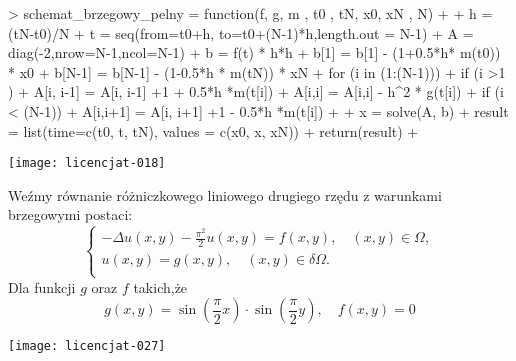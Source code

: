 \documentclass[notheorems]{beamer}
\begin{document}
\begin{frame}[fragile]
\begin{small}
\begin{Schunk}
\begin{Sinput}
> schemat_brzegowy_pelny = function(f, g, m , t0 , tN, x0, xN , N)
+ {
+   h = (tN-t0)/N
+   t = seq(from=t0+h, to=t0+(N-1)*h,length.out = N-1)
+   A = diag(-2,nrow=N-1,ncol=N-1)
+   b = f(t) * h*h
+   b[1] = b[1] - (1+0.5*h* m(t0)) * x0
+   b[N-1] = b[N-1] - (1-0.5*h * m(tN)) * xN
+   for (i in (1:(N-1))){
+     if (i >1 )
+       A[i, i-1] = A[i, i-1] +1 + 0.5*h *m(t[i])
+     A[i,i] = A[i,i] - h^2 * g(t[i])
+     if (i < (N-1))
+       A[i,i+1] =  A[i, i+1] +1 - 0.5*h *m(t[i])
+   }
+   x = solve(A, b)
+   result = list(time=c(t0, t, tN), values = c(x0, x, xN))
+   return(result)
+ }
\end{Sinput}
\end{Schunk}
\end{small}
\end{frame}
\begin{frame}
\texttt{[image: licencjat-018]}
\end{frame}
\begin{frame}
\begin{problem}
Weźmy równanie różniczkowego liniowego drugiego rzędu z warunkami brzegowymi postaci:
$$
\left\lbrace
\begin{array}{c}
-\Delta u(x,y) - \frac{\pi^2}{2}u(x,y) = f(x,y), \quad (x,y) \in \Omega, \\
u(x,y) = g(x,y), \quad (x,y) \in \delta \Omega.\\
\end{array}
\right.
$$
Dla funkcji $g$ oraz $f$ takich,że
$$
g(x,y) = \sin(\frac{\pi}{2}x) \cdot \sin(\frac{\pi}{2}y), \quad f(x,y)=0
$$
\end{problem}
\end{frame}
\begin{frame}
\texttt{[image: licencjat-027]}
\end{frame}
\end{document}
